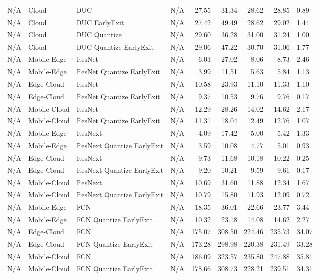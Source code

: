 \begin{tabular}{|l|l|l|l|r|r|r|r|}
N/A & Cloud & DUC & N/A & 27.55 & 31.34 & 28.62 & 28.85 & 0.89 \\
N/A & Cloud & DUC EarlyExit & N/A & 27.42 & 49.49 & 28.62 & 29.02 & 1.44 \\
N/A & Cloud & DUC Quantize & N/A & 29.60 & 36.28 & 31.00 & 31.24 & 1.00 \\
N/A & Cloud & DUC Quantize EarlyExit & N/A & 29.06 & 47.22 & 30.70 & 31.06 & 1.77 \\
N/A & Mobile-Edge & ResNet & N/A & 6.03 & 27.02 & 8.06 & 8.73 & 2.46 \\
N/A & Mobile-Edge & ResNet Quantize EarlyExit & N/A & 3.99 & 11.51 & 5.63 & 5.84 & 1.13 \\
N/A & Edge-Cloud & ResNet & N/A & 10.58 & 23.93 & 11.10 & 11.33 & 1.10 \\
N/A & Edge-Cloud & ResNet Quantize EarlyExit & N/A & 9.37 & 10.53 & 9.76 & 9.76 & 0.17 \\
N/A & Mobile-Cloud & ResNet & N/A & 12.29 & 28.26 & 14.02 & 14.62 & 2.17 \\
N/A & Mobile-Cloud & ResNet Quantize EarlyExit & N/A & 11.31 & 18.04 & 12.49 & 12.76 & 1.07 \\
N/A & Mobile-Edge & ResNext & N/A & 4.09 & 17.42 & 5.00 & 5.42 & 1.33 \\
N/A & Mobile-Edge & ResNext Quantize EarlyExit & N/A & 3.59 & 10.08 & 4.77 & 5.01 & 0.93 \\
N/A & Edge-Cloud & ResNext & N/A & 9.73 & 11.68 & 10.18 & 10.22 & 0.25 \\
N/A & Edge-Cloud & ResNext Quantize EarlyExit & N/A & 9.20 & 10.21 & 9.59 & 9.61 & 0.17 \\
N/A & Mobile-Cloud & ResNext & N/A & 10.69 & 31.60 & 11.88 & 12.34 & 1.67 \\
N/A & Mobile-Cloud & ResNext Quantize EarlyExit & N/A & 10.79 & 15.80 & 11.93 & 12.09 & 0.72 \\
N/A & Mobile-Edge & FCN & N/A & 18.35 & 36.01 & 22.66 & 23.77 & 3.44 \\
N/A & Mobile-Edge & FCN Quantize EarlyExit & N/A & 10.32 & 23.18 & 14.08 & 14.62 & 2.27 \\
N/A & Edge-Cloud & FCN & N/A & 175.07 & 308.50 & 224.46 & 235.73 & 34.07 \\
N/A & Edge-Cloud & FCN Quantize EarlyExit & N/A & 173.28 & 298.98 & 220.38 & 231.49 & 33.28 \\
N/A & Mobile-Cloud & FCN & N/A & 186.09 & 323.57 & 235.80 & 247.88 & 35.81 \\
N/A & Mobile-Cloud & FCN Quantize EarlyExit & N/A & 178.66 & 308.73 & 228.21 & 239.51 & 34.31 \\

\end{tabular}
